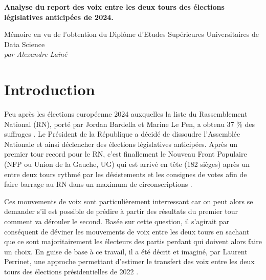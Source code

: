 \documentclass[11pt]{article}
\begin{document}
    

    \pagestyle{fancy}
    \fancyfoot{}
    \vspace{5cm}

    \begin{center}
        \Large \textbf{Analyse du report des voix entre les deux tours des élections législatives anticipées de 2024.}
    \end{center}
    
    \vspace{2cm}
    
    \begin{center}
        Mémoire en vu de l'obtention du Diplôme d'Etudes Supérieures Universitaires de Data Science \\
        \textit{par Alexandre Lainé}
    \end{center}

    \newpage
    \pagestyle{fancy}
    \fancyhead{} %
    \fancyfoot{} %
    \fancyfoot[R]{\thepage}

    \section{Introduction}

    Peu après les élections européenne 2024 auxquelles la liste du Rassemblement National (RN), porté par Jordan Bardella et Marine Le Pen, a obtenu 37 \% des suffrages \cite{Résultats_européennes_2024_2024}. Le Président de la République a décidé de dissoudre l'Assemblée Nationale et ainsi déclencher des élections législatives anticipées. Après un premier tour record pour le RN, c'est finallement le Nouveau Front Populaire (NFP ou Union de la Gauche, UG) qui est arrivé en tête (182 sièges) après un entre deux tours rythmé par les désistements et les consignes de votes afin de faire barrage au RN dans un maximum de circonscriptions \cite{Élections_législatives_françaises_de_2024_2024}. 

    Ces mouvements de voix sont particulièrement interressant car on peut alors se demander s'il est possible de prédire à partir des résultats du premier tour comment va dérouler le second. Basée sur cette question, il s'agirait par conséquent de déviner les mouvements de voix entre les deux tours en sachant que ce sont majoritairement les électeurs des partis perdant qui doivent alors faire un choix. En guise de base à ce travail, il a été décrit et imaginé, par Laurent Perrinet, une approche permettant d'estimer le transfert des voix entre les deux tours des élections présidentielles de 2022 \cite{Perrinet_2022}.
    
\end{document}
